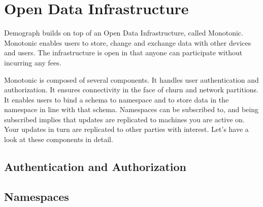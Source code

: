 \section{Open Data Infrastructure}

Demograph builds on top of an Open Data Infrastructure, called Monotonic. Monotonic enables users to store, change and exchange data with other devices and users. The infrastructure is open in that anyone can participate without incurring any fees.

Monotonic is composed of several components. It handles user authentication and authorization. It ensures connectivity in the face of churn and network partitions. It enables users to bind a schema to namespace and to store data in the namespace in line with that schema. Namespaces can be subscribed to, and being subscribed implies that updates are replicated to machines you are active on. Your updates in turn are replicated to other parties with interest. Let's have a look at these components in detail.

\subsection{Authentication and Authorization}

\subsection{Namespaces}

